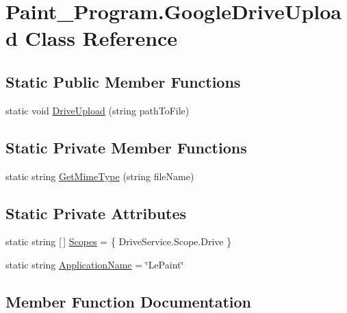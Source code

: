 \hypertarget{class_paint___program_1_1_google_drive_upload}{}\section{Paint\+\_\+\+Program.\+Google\+Drive\+Upload Class Reference}
\label{class_paint___program_1_1_google_drive_upload}
\subsection*{Static Public Member Functions}
\begin{DoxyCompactItemize}
\item 
static void \mbox{\hyperlink{class_paint___program_1_1_google_drive_upload_afd2b70d90c0c3a412f9c2f11d0c63f99}{Drive\+Upload}} (string path\+To\+File)
\end{DoxyCompactItemize}
\subsection*{Static Private Member Functions}
\begin{DoxyCompactItemize}
\item 
static string \mbox{\hyperlink{class_paint___program_1_1_google_drive_upload_aa3a741d118b7e3b4cb17ad5f1a871201}{Get\+Mime\+Type}} (string file\+Name)
\end{DoxyCompactItemize}
\subsection*{Static Private Attributes}
\begin{DoxyCompactItemize}
\item 
static string \mbox{[}$\,$\mbox{]} \mbox{\hyperlink{class_paint___program_1_1_google_drive_upload_aa60a9c9a8dd82f038fe5fbb247fc5c38}{Scopes}} = \{ Drive\+Service.\+Scope.\+Drive \}
\item 
static string \mbox{\hyperlink{class_paint___program_1_1_google_drive_upload_a20c7374606e9a10898d08f487a4d5319}{Application\+Name}} = \char`\"{}Le\+Paint\char`\"{}
\end{DoxyCompactItemize}


\subsection{Member Function Documentation}
\mbox{\label{class_paint___program_1_1_google_drive_upload_afd2b70d90c0c3a412f9c2f11d0c63f99}} 
